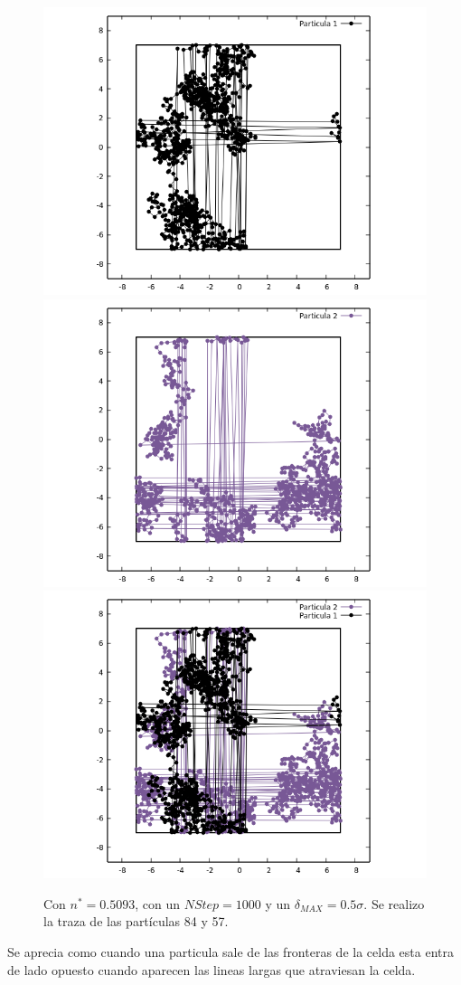 \documentclass[12pt,letterpaper]{article}
\begin{document}
	\begin{figure}[H]
		\centering
		\includegraphics[width=0.49\linewidth]{Particula1.png}
		\includegraphics[width=0.49\linewidth]{Particula2.png}\\
		\includegraphics[width=0.75\linewidth]{Traza.png}
		\caption{ Con $n^*=0.5093$, con un $NStep=1000$ y un $\delta_{MAX}=0.5\sigma$. Se realizo la traza de las partículas 84 y 57.}
	\end{figure}
Se aprecia como cuando una particula sale de las fronteras de la celda esta entra de lado opuesto cuando aparecen las lineas largas que atraviesan la celda.
\end{document}
